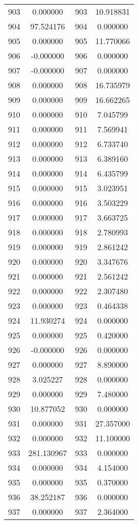 \documentclass[12pt]{article}
\begin{document}
\begin{longtable}{@{}cccc@{}}
903 & 0.000000 & 903 & 10.918831 \\
904 & 97.524176 & 904 & 0.000000 \\
905 & 0.000000 & 905 & 11.770066 \\
906 & -0.000000 & 906 & 0.000000 \\
907 & -0.000000 & 907 & 0.000000 \\
908 & 0.000000 & 908 & 16.735979 \\
909 & 0.000000 & 909 & 16.662265 \\
910 & 0.000000 & 910 & 7.045799 \\
911 & 0.000000 & 911 & 7.569941 \\
912 & 0.000000 & 912 & 6.733740 \\
913 & 0.000000 & 913 & 6.389160 \\
914 & 0.000000 & 914 & 6.435799 \\
915 & 0.000000 & 915 & 3.023951 \\
916 & 0.000000 & 916 & 3.503229 \\
917 & 0.000000 & 917 & 3.663725 \\
918 & 0.000000 & 918 & 2.780993 \\
919 & 0.000000 & 919 & 2.861242 \\
920 & 0.000000 & 920 & 3.347676 \\
921 & 0.000000 & 921 & 2.561242 \\
922 & 0.000000 & 922 & 2.307480 \\
923 & 0.000000 & 923 & 0.464338 \\
924 & 11.930274 & 924 & 0.000000 \\
925 & 0.000000 & 925 & 0.420000 \\
926 & -0.000000 & 926 & 0.000000 \\
927 & 0.000000 & 927 & 8.890000 \\
928 & 3.025227 & 928 & 0.000000 \\
929 & 0.000000 & 929 & 7.480000 \\
930 & 10.877052 & 930 & 0.000000 \\
931 & 0.000000 & 931 & 27.357000 \\
932 & 0.000000 & 932 & 11.100000 \\
933 & 281.130967 & 933 & 0.000000 \\
934 & 0.000000 & 934 & 4.154000 \\
935 & 0.000000 & 935 & 0.370000 \\
936 & 38.252187 & 936 & 0.000000 \\
937 & 0.000000 & 937 & 2.364000 \\

\end{longtable}
\end{document}

